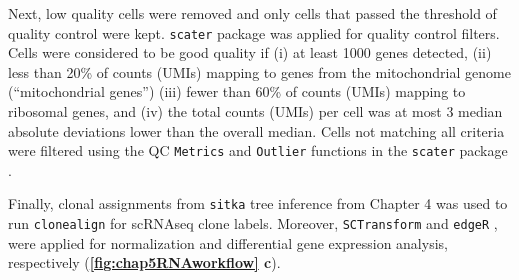 Next, low quality cells were removed and only cells that passed the threshold of quality control were kept. 
 \texttt{scater} package was applied for quality control filters. Cells were considered to be good quality if (i) at least 1000 genes detected, (ii) less than 20\% of counts (UMIs) mapping to genes from the mitochondrial genome (``mitochondrial genes'') (iii) fewer than 60\% of counts (UMIs) mapping to ribosomal genes, and (iv) the total counts (UMIs) per cell was at most 3 median absolute deviations lower than the overall median. Cells not matching all criteria were filtered using the \ac{QC} \texttt{Metrics} and \texttt{Outlier} functions in the \texttt{scater} package \cite{mccarthy2017scater}.

Finally, clonal assignments from \texttt{sitka} tree inference from Chapter 4 was used to run \texttt{clonealign} \cite{campbell2019clonealign} for \ac{scRNAseq} clone labels. Moreover, \texttt{SCTransform} \cite{hafemeister2019normalization} and \texttt{edgeR} \cite{robinson2010edger}, were applied for normalization and differential gene expression analysis, respectively (\textbf{\autoref{fig:chap5RNAworkflow} c}). 


